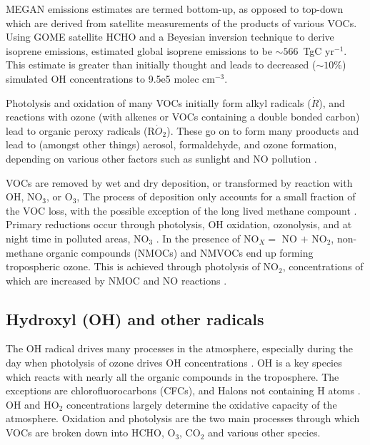     MEGAN emissions estimates are termed bottom-up, as opposed to top-down which are derived from satellite measurements of the products of various VOCs.
    Using GOME satellite HCHO and a Beyesian inversion technique to derive isoprene emissions, \citet{Shim2005} estimated global isoprene emissions to be $\sim566$~TgC yr$^{-1}$. 
    This estimate is greater than initially thought and leads to decreased ($\sim10\%$) simulated OH concentrations to 9.5e5 molec cm$^{-3}$.
    
    Photolysis and oxidation of many VOCs initially form alkyl radicals ($\dot{R}$), and reactions with ozone (with alkenes or VOCs containing a double bonded carbon) lead to organic peroxy radicals (R$\dot{O}_2$). 
    These go on to form many prooducts and lead to (amongst other things) aerosol, formaldehyde, and ozone formation, depending on various other factors such as sunlight and NO pollution \citep{Atkinson2000}.
    
    VOCs are removed by wet and dry deposition, or transformed by reaction with OH, NO$_3$, or O$_3$,
    The process of deposition only accounts for a small fraction of the VOC loss, with the possible exception of the long lived methane compount \citep{AtkinsonArey2003}.
    Primary reductions occur through photolysis, OH oxidation, ozonolysis, and at night time in polluted areas, NO$_3$ \citep{AtkinsonArey2003, Brown2009}.
    In the presence of NO$_X = $ NO $+$ NO$_2$, non-methane organic compounds (NMOCs) and NMVOCs end up forming tropospheric ozone.
    This is achieved through photolysis of NO$_2$, concentrations of which are increased by NMOC and NO reactions \citep{AtkinsonArey2003}.
  
  \subsection{Hydroxyl (OH) and other radicals}
    \label{ch_LitRev:sec:RadicalFormation}
    
    The OH radical drives many processes in the atmosphere, especially during the day when photolysis of ozone drives OH concentrations \citep{Atkinson2000}.    
    OH is a key species which reacts with nearly all the organic compounds in the troposphere.
    The exceptions are chlorofluorocarbons (CFCs), and Halons not containing H atoms \citep{Atkinson2000}.
    OH and HO$_2$ concentrations largely determine the oxidative capacity of the atmosphere.
    Oxidation and photolysis are the two main processes through which VOCs are broken down into HCHO, O$_3$, CO$_2$ and various other species.
    
